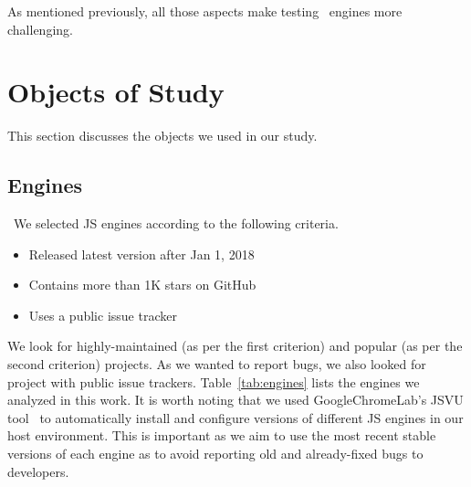 \documentclass[10pt,conference,anonymous]{IEEEtran}
\begin{document}
As mentioned previously, all those aspects make testing \js\ engines
more challenging.






\section{Objects of Study}
\label{sec:methodology}

This section discusses the objects we used in our study.

\subsection{Engines}
\label{sec:methodology:engines}~We selected 
JS engines according to the following criteria.

\begin{itemize}
\item Released latest version after Jan 1, 2018
\item Contains more than 1K stars on GitHub  
\item Uses a public issue tracker
\end{itemize}  

We look for highly-maintained (as per the first criterion) and popular
(as per the second criterion) projects. As we wanted to report bugs,
we also looked for project with public issue
trackers. Table~\ref{tab:engines} lists the engines we analyzed in
this work. It is worth noting that we used GoogleChromeLab's JSVU
tool~\cite{jsvu} to automatically install and configure versions of
different JS engines in our host environment. This is important as we
aim to use the most recent stable versions of each engine as to avoid
reporting old and already-fixed bugs to developers.
\end{document}
